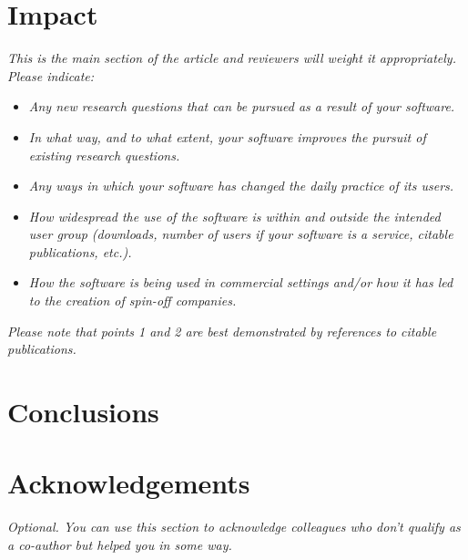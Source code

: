 \documentclass[preprint,12pt, a4paper]{elsarticle}
\begin{document}
\section{Impact}
\textit{This is the main section of the article and reviewers will weight it appropriately.
Please indicate:}
\begin{itemize}
    \item \textit{Any new research questions that can be pursued as a result of your software.}
    \item \textit{In what way, and to what extent, your software improves the pursuit of existing research questions.}
    \item \textit{Any ways in which your software has changed the daily practice of its users.}
    \item \textit{How widespread the use of the software is within and outside the intended user group (downloads, number of users if your software is a service, citable publications, etc.).}
    \item \textit{How the software is being used in commercial settings and/or how it has led to the creation of spin-off companies.}
    \end{itemize}
\textit{Please note that points 1 and 2 are best demonstrated by
  references to citable publications.}

\section{Conclusions}
\cite{Kulesza2022}

\section*{Acknowledgements}
\label{}
\textit{Optional. You can use this section to acknowledge colleagues who don’t qualify as a co-author but helped you in some way. }




\end{document}
